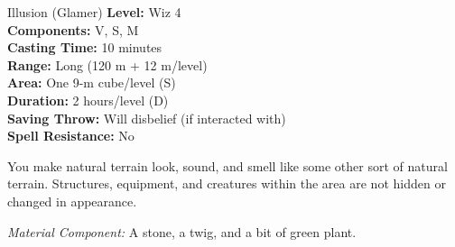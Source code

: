 {Illusion (Glamer)}
{
	\textbf{Level:}
	Wiz 4\\
	\textbf{Components:}
	V, S, M\\
	\textbf{Casting Time:}
	10 minutes\\
	\textbf{Range:}
	Long (120 m + 12 m/level)\\
	\textbf{Area:}
	One 9-m cube/level (S)\\
	\textbf{Duration:}
	2 hours/level (D)\\
	\textbf{Saving Throw:}
	Will disbelief (if interacted with)\\
	\textbf{Spell Resistance:}
	No\\
}
{
	You make natural terrain look, sound, and smell like some other sort of natural terrain. Structures, equipment, and creatures within the area are not hidden or changed in appearance.

	\textit{Material Component:}
	A stone, a twig, and a bit of green plant.

}
